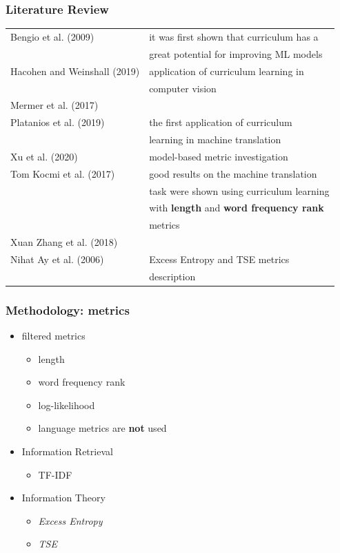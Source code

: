 \documentclass{beamer}
\begin{document}
\begin{frame}
	\frametitle{Literature Review}
	\begin{table}
		\begin{tabular}{l|l}
			Bengio et al. (2009) & it was first shown that curriculum has a\\&great potential for improving ML models\\
			\hline
			Hacohen and Weinshall (2019)& application of curriculum learning in\\&computer vision\\
			Mermer et al. (2017) &\\
			\hline
			Platanios et al. (2019) & the first application of curriculum \\&learning in machine translation\\
			\hline
			Xu et al. (2020)& model-based metric investigation\\
			\hline
			Tom Kocmi et al. (2017) & good results on the machine translation\\&task were shown using curriculum learning\\&with {\bf length} and {\bf word frequency rank}\\&metrics\\
			Xuan Zhang et al. (2018)&\\
			\hline
			Nihat Ay et al. (2006) & Excess Entropy and TSE metrics\\& description \\
		\end{tabular}
	\end{table}
\end{frame}

\begin{frame}
	\frametitle{Methodology: metrics}
	\begin{itemize}
		\item filtered metrics
			\begin{itemize}
				\item length
				\item word frequency rank
				\item log-likelihood
				\item language metrics are {\bf not} used
			\end{itemize}
		\item Information Retrieval
			\begin{itemize}
				\item TF-IDF
			\end{itemize}
		\item Information Theory
			\begin{itemize}
				\item {\it Excess Entropy}
				\item {\it TSE}
			\end{itemize}
	\end{itemize}
\end{frame}
\end{document}
